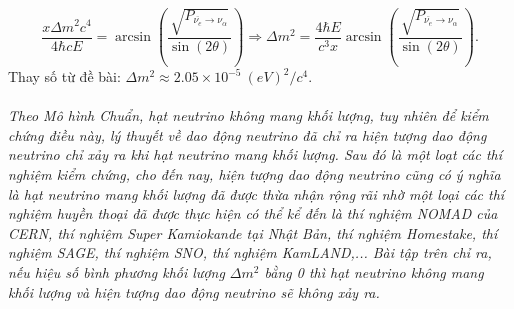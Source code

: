 \begin{enumerate}
    \begin{equation} \label{eq14_neutrino_oscillation}
        \dfrac{x\Delta m^2 c^4}{4\hbar c E} =\arcsin \left(\dfrac{\sqrt{P_{\overline{\nu_e} \rightarrow \nu_\alpha}}}{\sin (2\theta)}\right) \Rightarrow 
        \Delta m^2 = \dfrac{4\hbar E}{c^3x}\arcsin \left(\dfrac{\sqrt{P_{\overline{\nu_e} \rightarrow \nu_\alpha}}}{\sin (2\theta)}\right).
    \end{equation}
    Thay số từ đề bài: $\Delta m^2 \approx 2.05\times 10^{-5} \ \si{(eV)^2/c^4}$.\\ \\
    \textit{Theo Mô hình Chuẩn, hạt neutrino không mang khối lượng, tuy nhiên để kiểm chứng điều này, lý thuyết về dao động neutrino đã chỉ ra hiện tượng dao động neutrino chỉ xảy ra khi hạt neutrino mang khối lượng. Sau đó là một loạt các thí nghiệm kiểm chứng, cho đến nay, hiện tượng dao động neutrino cũng có ý nghĩa là hạt neutrino mang khối lượng đã được thừa nhận rộng rãi nhờ một loại các thí nghiệm huyền thoại đã được thực hiện có thể kể đến là thí nghiệm NOMAD của CERN, thí nghiệm Super Kamiokande tại Nhật Bản, thí nghiệm Homestake, thí nghiệm SAGE, thí nghiệm SNO, thí nghiệm KamLAND,... Bài tập trên chỉ ra, nếu hiệu số bình phương khối lượng $\Delta m^2$ bằng 0 thì hạt neutrino không mang khối lượng và hiện tượng dao động neutrino sẽ không xảy ra.}
\end{enumerate}

